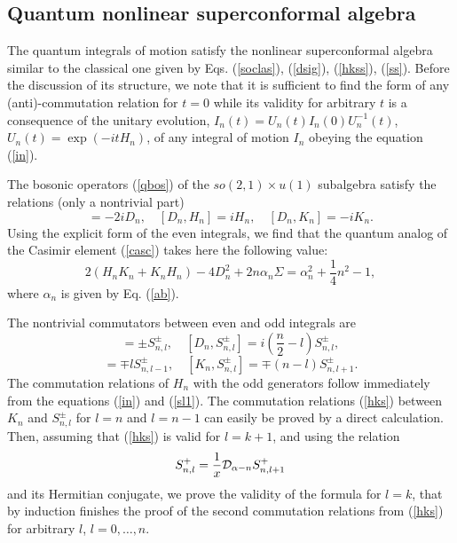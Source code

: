 \documentclass[a4paper,12pt]{article}
\begin{document}
\subsection{Quantum nonlinear superconformal algebra}

The quantum integrals of motion satisfy
the nonlinear superconformal algebra
similar to the classical one given by Eqs.
(\ref{soclas}), (\ref{dsig}), (\ref{hkss}),
(\ref{ss}).
Before the discussion of its structure,
we note that it is sufficient
to find the form of any (anti)-commutation
relation for $t=0$ while its validity for arbitrary $t$
is a consequence of the unitary evolution,
$I_n(t)=U_n(t)I_n(0)U_n^{-1}(t)$, $U_n(t)=\exp (-itH_n)$,
of any integral of motion $I_n$ obeying the equation
(\ref{in}).

The bosonic operators
(\ref{qbos})  of the  $so(2,1)\times u(1)$
subalgebra satisfy the relations (only a nontrivial part)
\begin{equation}
[H_n,K_n]=-2iD_n,\quad
[D_n,H_n]=iH_n,\quad
[D_n,K_n]=-iK_n.
\label{qso}
\end{equation}
Using the explicit form of the even integrals,
we find that the quantum analog of the Casimir element
(\ref{casc}) takes here the following value:
\begin{equation}
2(H_nK_n+K_nH_n)-4D_n^2+2n\alpha_n \Sigma  =
\alpha_n^2+\frac{1}{4}n^2-1,
\label{qcas}
\end{equation}
where $\alpha_n$ is given by Eq. (\ref{ab}).

The nontrivial commutators between even and odd
integrals are
\begin{equation}
[\Sigma,S^\pm_{n,l}]=\pm S^\pm_{n,l},\quad
[D_n,S^\pm_{n,l}]=i\left(\frac{n}{2}-l\right)
S^\pm_{n,l},
\label{sds}
\end{equation}
\begin{equation}
[H_n,S^\pm_{n,l}]=\mp lS^\pm_{n,l-1},\quad
[K_n,S^\pm_{n,l}]=\mp (n-l)S^\pm_{n,l+1}.
\label{hks}
\end{equation}
The commutation relations of $H_n$ with the
odd generators
follow immediately from
the equations (\ref{in}) and (\ref{sl1}).
The commutation relations (\ref{hks})
between $K_n$ and $S^\pm_{n,l}$ for
$l=n$ and $l=n-1$ can easily be proved by a direct
calculation. Then, assuming that (\ref{hks}) is valid for
$l=k+1$, and using the relation
$$
S^+_{n,l}=\frac{1}{x}{\cal D}_{\alpha -n}S^+_{n,l+1}
$$
and its Hermitian conjugate, we prove the validity
of the formula for $l=k$, that by induction
finishes the proof of the second commutation relations
from (\ref{hks}) for arbitrary
$l$, $l=0,\ldots, n$.
\end{document}
